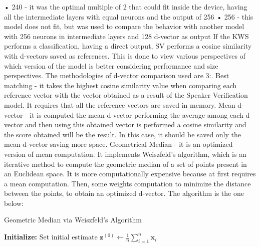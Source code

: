 • 240 - it was the optimal multiple of 2 that could fit inside the device, having all the intermediate layers with equal neurons and the output of 256\newline
• 256 - this model does not fit, but was used to compare the behavior with another model with 256 neurons in intermediate layers and 128 d-vector as output\newline\newline
If the KWS performs a classification, having a direct output, SV performs a cosine similarity with d-vectors saved as references. This is done to view various perspectives of which version of the model is better considering performance and size perspectives. The methodologies of d-vector comparison used are 3:. Best matching - it takes the highest cosine similarity value when comparing each reference vector with the vector obtained as a result of the Speaker Verification model. It requires that all the reference vectors are saved in memory. Mean d-vector - it is computed the mean d-vector performing the average among each d-vector and then using this obtained vector is performed a cosine similarity and the score obtained will be the result. In this case, it should be saved only the mean d-vector saving more space. Geometrical Median - it is an optimized version of mean computation. It implements Weiszfeld's algorithm\cite{weiszfeldsalgorithm}, which is an iterative method to compute the geometric median of a set of points present in an Euclidean space. It is more computationally expensive because at first requires a mean computation. Then, some weights computation to minimize the distance between the points, to obtain an optimized d-vector. The algorithm is the one below:\newline
\begin{algorithm}[H]
\caption{Geometric Median via Weiszfeld’s Algorithm}
\nl \textbf{Initialize:} Set initial estimate $\mathbf{z}^{(0)} \gets \frac{1}{n} \sum_{i=1}^n \mathbf{x}_i$\;
\nl {}
\end{algorithm}
